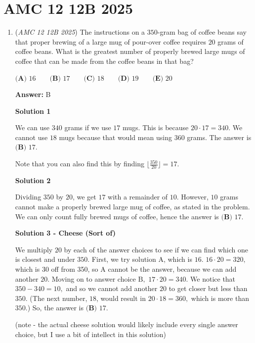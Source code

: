 \section{AMC 12 12B 2025}
        \begin{enumerate}
        	\item (\textit{AMC 12 12B 2025}) The instructions on a $350$-gram bag of coffee beans say that proper brewing of a large mug of pour-over coffee requires $20$ grams of coffee beans. What is the greatest number of properly brewed large mugs of coffee that can be made from the coffee beans in that bag?


 $\textbf{(A) } 16 \qquad\textbf{(B) } 17 \qquad\textbf{(C) } 18 \qquad\textbf{(D) } 19 \qquad\textbf{(E) } 20$

 \textbf{Answer: }B



\textbf{Solution 1}

We can use $340$ grams if we use $17$ mugs. This is because $20 \cdot 17 = 340$. We cannot use $18$ mugs because that would mean using $360$ grams. The answer is $\boxed{\textbf{(B) } 17}$.

 Note that you can also find this by finding $\lfloor \frac{350}{20} \rfloor = 17.$




\textbf{Solution 2}

Dividing $350$ by $20$, we get $17$ with a remainder of $10$. However, $10$ grams cannot make a properly brewed large mug of coffee, as stated in the problem. We can only count fully brewed mugs of coffee, hence the answer is $\boxed{\textbf{(B) } 17}$.

 



\textbf{Solution 3 - Cheese (Sort of)}

We multiply $20$ by each of the answer choices to see if we can find which one is closest and under $350.$ First, we try solution $\text{A}$, which is $16$. $16 \cdot 20 = 320,$ which is $30$ off from 350, so $\text{A}$ cannot be the answer, because we can add another $20$. Moving on to answer choice $\text{B},$ $17 \cdot 20 = 340.$ We notice that $350-340=10,$ and so we cannot add another $20$ to get closer but less than $350.$ (The next number, $18$, would result in $20 \cdot 18=360,$ which is more than $350$.) So, the answer is $\boxed{\textbf{(B) } 17}$.

 (note - the actual cheese solution would likely include every single answer choice, but I use a bit of intellect in this solution)


\end{enumerate}
